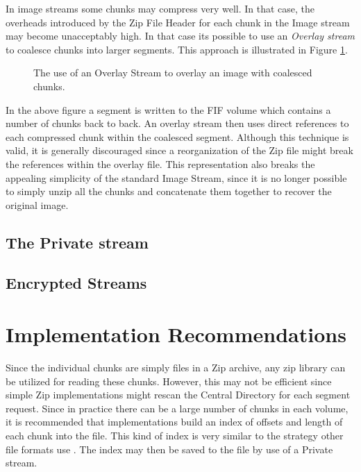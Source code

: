 \documentclass[12pt, conference]{IEEEtran}
\begin{document}
In image streams some chunks may compress very well. In that case, the
overheads introduced by the Zip File Header for each chunk in the
Image stream may become unacceptably high. In that case its possible
to use an {\em Overlay stream} to coalesce chunks into larger
segments. This approach is illustrated in Figure \ref{overlay}.

\begin{figure}[tb]
  \begin{center}
  \mbox{\columnwidth {}}
  \caption{The use of an Overlay Stream to overlay an image with
coalesced chunks.}
  \label{overlay}
  \end{center}
\end{figure}

In the above figure a segment is written to the FIF volume which
contains a number of chunks back to back. An overlay stream then uses
direct references to each compressed chunk within the coalesced
segment. Although this technique is valid, it is generally
discouraged since a reorganization of the Zip file might break the
references within the overlay file. This representation also breaks
the appealing simplicity of the standard Image Stream, since it is no
longer possible to simply unzip all the chunks and concatenate them
together to recover the original image.


\subsection{The Private stream}

\subsection{Encrypted Streams}


\section{Implementation Recommendations}
Since the individual chunks are simply files in a Zip archive, any zip
library can be utilized for reading these chunks. However, this may
not be efficient since simple Zip implementations might rescan the
Central Directory for each segment request. Since in practice there
can be a large number of chunks in each volume, it is recommended that
implementations build an index of offsets and length of each chunk
into the file. This kind of index is very similar to the strategy
other file formats use \cite{EWF}. The index may then be saved to the
file by use of a Private stream.
\end{document}
